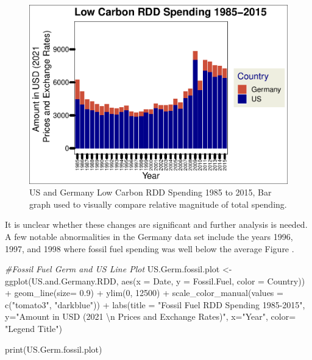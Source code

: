 \documentclass[
  12pt,
]{article}
\newenvironment{Shaded}{\begin{snugshade}}{\end{snugshade}}
\newcommand{\AttributeTok}[1]{\textcolor[rgb]{0.77,0.63,0.00}{#1}}
\newcommand{\CommentTok}[1]{\textcolor[rgb]{0.56,0.35,0.01}{\textit{#1}}}
\newcommand{\DecValTok}[1]{\textcolor[rgb]{0.00,0.00,0.81}{#1}}
\newcommand{\FloatTok}[1]{\textcolor[rgb]{0.00,0.00,0.81}{#1}}
\newcommand{\FunctionTok}[1]{\textcolor[rgb]{0.00,0.00,0.00}{#1}}
\newcommand{\NormalTok}[1]{#1}
\newcommand{\OtherTok}[1]{\textcolor[rgb]{0.56,0.35,0.01}{#1}}
\newcommand{\SpecialCharTok}[1]{\textcolor[rgb]{0.00,0.00,0.00}{#1}}
\newcommand{\StringTok}[1]{\textcolor[rgb]{0.31,0.60,0.02}{#1}}
\begin{document}
\begin{figure}
\centering
\includegraphics{Chang_Jenkins_Mullens_ENV872_Final_files/figure-latex/US and Germ Low Carbon-1.pdf}
\caption{US and Germany Low Carbon RDD Spending 1985 to 2015, Bar graph
used to visually compare relative magnitude of total spending.}
\end{figure}

It is unclear whether these changes are significant and further analysis
is needed. A few notable abnormalities in the Germany data set include
the years 1996, 1997, and 1998 where fossil fuel spending was well below
the average Figure .

\begin{Shaded}
\begin{Highlighting}[]
\CommentTok{\#Fossil Fuel Germ and US Line Plot}
\NormalTok{US.Germ.fossil.plot }\OtherTok{\textless{}{-}} \FunctionTok{ggplot}\NormalTok{(US.and.Germany.RDD,}
                              \FunctionTok{aes}\NormalTok{(}\AttributeTok{x =}\NormalTok{ Date,}
                                  \AttributeTok{y =}\NormalTok{ Fossil.Fuel, }
                                  \AttributeTok{color =}\NormalTok{ Country)) }\SpecialCharTok{+} 
  \FunctionTok{geom\_line}\NormalTok{(}\AttributeTok{size=} \FloatTok{0.9}\NormalTok{) }\SpecialCharTok{+}
  \FunctionTok{ylim}\NormalTok{(}\DecValTok{0}\NormalTok{, }\DecValTok{12500}\NormalTok{) }\SpecialCharTok{+}
  \FunctionTok{scale\_color\_manual}\NormalTok{(}\AttributeTok{values =} \FunctionTok{c}\NormalTok{(}\StringTok{"tomato3"}\NormalTok{, }\StringTok{"darkblue"}\NormalTok{)) }\SpecialCharTok{+}
  \FunctionTok{labs}\NormalTok{(}\AttributeTok{title =} \StringTok{"Fossil Fuel RDD Spending 1985{-}2015"}\NormalTok{,}
       \AttributeTok{y=}\StringTok{"Amount in USD (2021 }\SpecialCharTok{\textbackslash{}n}\StringTok{ Prices and Exchange Rates)"}\NormalTok{,}
       \AttributeTok{x=}\StringTok{"Year"}\NormalTok{,}
       \AttributeTok{color=} \StringTok{"Legend Title"}\NormalTok{)}

\FunctionTok{print}\NormalTok{(US.Germ.fossil.plot)}
\end{Highlighting}
\end{Shaded}
\end{document}
